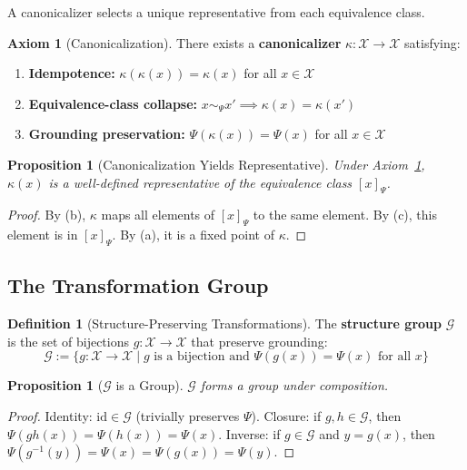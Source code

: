 \documentclass[12pt]{article}
\newtheorem{proposition}[theorem]{Proposition}
\theoremstyle{definition}
\newtheorem{definition}[theorem]{Definition}
\newtheorem{axiom}{Axiom}
\theoremstyle{remark}
\newcommand{\calX}{\mathcal{X}}
\newcommand{\calG}{\mathcal{G}}
\begin{document}
A canonicalizer selects a unique representative from each equivalence class.

\begin{axiom}[Canonicalization]\label{ax:canon}
There exists a \textbf{canonicalizer} $\kappa : \calX \to \calX$ satisfying:
\begin{enumerate}[label=(\alph*)]
    \item \textbf{Idempotence:} $\kappa(\kappa(x)) = \kappa(x)$ for all $x \in \calX$
    \item \textbf{Equivalence-class collapse:} $x \sim_\Psi x' \implies \kappa(x) = \kappa(x')$
    \item \textbf{Grounding preservation:} $\Psi(\kappa(x)) = \Psi(x)$ for all $x \in \calX$
\end{enumerate}
\end{axiom}

\begin{proposition}[Canonicalization Yields Representative]\label{prop:canon-rep}
Under Axiom~\ref{ax:canon}, $\kappa(x)$ is a well-defined representative of the equivalence class $[x]_\Psi$.
\end{proposition}

\begin{proof}
By (b), $\kappa$ maps all elements of $[x]_\Psi$ to the same element. By (c), this element is in $[x]_\Psi$.
By (a), it is a fixed point of $\kappa$.
\end{proof}

\subsection{The Transformation Group}

\begin{definition}[Structure-Preserving Transformations]\label{def:struct-group}
The \textbf{structure group} $\calG$ is the set of
bijections $g : \calX \to \calX$ that preserve grounding:
\[
    \calG := \{g : \calX \to \calX \mid g \text{ is a bijection and } \Psi(g(x)) = \Psi(x) \text{ for all } x\}
\]
\end{definition}

\begin{proposition}[$\calG$ is a Group]\label{prop:group}
$\calG$ forms a group under composition.
\end{proposition}

\begin{proof}
Identity: $\mathrm{id} \in \calG$ (trivially preserves $\Psi$). Closure: if $g, h \in \calG$, then $\Psi(gh(x)) = \Psi(h(x)) =
\Psi(x)$. Inverse: if $g \in \calG$ and $y = g(x)$, then $\Psi(g^{-1}(y)) = \Psi(x) = \Psi(g(x)) = \Psi(y)$.
\end{proof}
\end{document}
